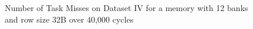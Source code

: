 \begin{figure}
\centering
{}
\caption{Number of Task Misses on Dataset IV for a memory with 12 banks and row size 32B over 40,000 cycles}
\end{figure}




